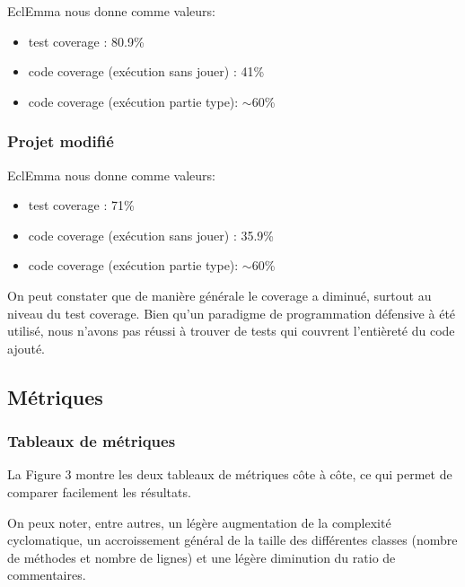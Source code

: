 \documentclass[a4paper,12pt]{report} %
\begin{document}
EclEmma nous donne comme valeurs:
\begin{itemize}
\item test coverage : 80.9\%
\item code coverage (exécution sans jouer) : 41\%
\item code coverage (exécution partie type): $\sim$60\%
\end{itemize}

\subsubsection{Projet modifié}

EclEmma nous donne comme valeurs:
\begin{itemize}
\item test coverage : 71\%
\item code coverage (exécution sans jouer) : 35.9\%
\item code coverage (exécution partie type): $\sim$60\%
\end{itemize}
On peut constater que de manière générale le coverage a diminué, surtout
au niveau du test coverage. Bien qu'un paradigme de programmation
défensive à été utilisé, nous n'avons pas réussi à trouver de tests
qui couvrent l'entièreté du code ajouté.


\subsection{Métriques}


\subsubsection{Tableaux de métriques}

La Figure 3 montre les deux tableaux de métriques côte à côte, ce
qui permet de comparer facilement les résultats.

On peux noter, entre autres, un légère augmentation de la complexité
cyclomatique, un accroissement général de la taille des différentes
classes (nombre de méthodes et nombre de lignes) et une légère diminution
du ratio de commentaires.
\end{document}
